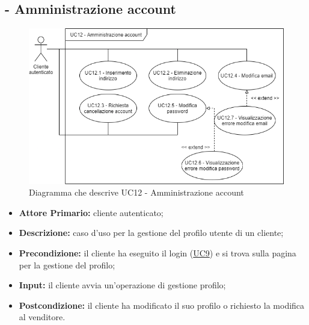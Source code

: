 \subsection{ - Amministrazione account}
\begin{figure}[H]
    \centering
    \includegraphics[width=\linewidth]{res/images/UC/UC12.png}
    \caption{Diagramma che descrive UC12 - Amministrazione account} 
\end{figure}
\begin{itemize}
    \item \textbf{Attore Primario:} cliente autenticato;
    \item \textbf{Descrizione:} caso d'uso per la gestione del profilo utente di un cliente;
    \item \textbf{Precondizione:} il cliente ha eseguito il login (\hyperref[UC9]{UC9}) e si trova sulla pagina per la gestione del profilo;
    \item \textbf{Input:} il cliente avvia un'operazione di gestione profilo;
    \item \textbf{Postcondizione:} il cliente ha modificato il suo profilo o richiesto la modifica al venditore.
\end{itemize}

\stepsubUserCase
